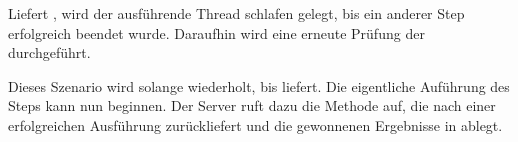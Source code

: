 Liefert  , wird der ausführende Thread
schlafen gelegt, bis ein anderer Step erfolgreich beendet wurde.
Daraufhin wird eine erneute Prüfung der  durchgeführt.

Dieses Szenario wird solange wiederholt, bis 
 liefert.
Die eigentliche Auführung des Steps kann nun beginnen.
Der Server ruft dazu die Methode  auf, die nach einer erfolgreichen
Ausführung  zurückliefert und die gewonnenen Ergebnisse in
 ablegt.

